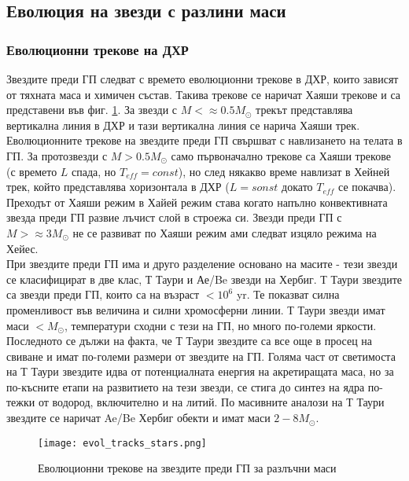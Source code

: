 \documentclass[a4paper,12pt]{article}
\begin{document}
\subsection{Еволюция на звезди с разлини маси}

\subsubsection{Еволюционни трекове на ДХР}
Звездите преди ГП следват с времето еволюционни трекове в ДХР, които зависят от тяхната маса и химичен състав. Такива трекове се наричат Хаяши трекове и са представени във фиг. \ref{fig:evol_tracks_stars}. За звезди с $M<\approx 0.5 M_\odot$ трекът представлява вертикална линия в ДХР и тази вертикална линия се нарича Хаяши трек. Еволюционните трекове на звездите преди ГП свършват с навлизането на телата в ГП. За протозвезди с $M > 0.5 M_\odot$ само първоначално трекове са Хаяши трекове (с времето $L$ спада, но $T_{eff}=const$), но след някакво време навлизат в Хейней трек, който представлява хоризонтала в ДХР ($L=sonst$ докато $T_{eff}$ се покачва). Преходът от Хаяши режим в Хайей режим става когато напълно конвективната звезда преди ГП развие лъчист слой в строежа си. Звезди преди ГП с $M> \approx 3 M_\odot$ не се развиват по Хаяши режим ами следват изцяло режима на Хейес.\\

При звездите преди ГП има и друго разделение основано на масите - тези звезди се класифицират в две клас, Т Таури и Ае/Be звезди на Хербиг. Т Таури звездите са звезди преди ГП, които са на възраст $<10^6$ yr. Те показват силна променливост във величина и силни хромосферни линии. Т Таури звезди имат маси $<M_\odot$, температури сходни с тези на ГП, но много по-големи яркости. Последното се дължи на факта, че Т Таури звездите са все още в просец на свиване и имат по-големи размери от звездите на ГП. Голяма част от светимоста на Т Таури звездите идва от потенциалната енергия на акретиращата маса, но за по-късните етапи на развитието на тези звезди, се стига до синтез на ядра по-тежки от водород, включително и на литий. По масивните аналози на Т Таури звездите се наричат Ae/Be Хербиг обекти и имат маси $2-8 M_\odot$. 


\begin{figure}[h!]
\centering
\texttt{[image: evol\_tracks\_stars.png]}
\caption{Еволюционни трекове на звездите преди ГП за разлъчни маси}
\label{fig:evol_tracks_stars}
\end{figure}
\end{document}
